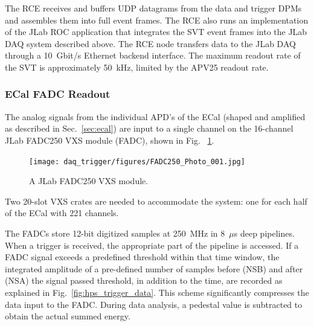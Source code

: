 The RCE receives and buffers UDP datagrams from the data and trigger DPMs and
 assembles them into full event frames. The RCE also runs an implementation of the JLab ROC application 
that integrates the SVT event frames into the JLab DAQ 
 system described above. The RCE node transfers data to the JLab DAQ  
 through a 10~Gbit/s Ethernet backend interface. The maximum readout rate of the SVT is approximately 50~kHz, limited by the APV25 readout rate. 










\subsubsection{ECal FADC Readout}
\label{sec:fadc_daq}
The analog signals from the individual APD's of the ECal (shaped and amplified as described in Sec.~\ref{sec:ecal}) are input to a single channel on the 16-channel JLab FADC250 VXS module (FADC), shown in Fig. ~\ref{fig:fadc}. 
\begin{figure}[t]
\texttt{[image: daq\_trigger/figures/FADC250\_Photo\_001.jpg]}
\caption{\small{A JLab FADC250 VXS module.}}
\label{fig:fadc}
\end{figure}

Two 20-slot VXS crates are needed to accommodate the system: one for each half of the ECal with 221 channels. 

The FADCs store 12-bit digitized samples at 250~MHz in 8~$\mu$s deep pipelines. 
When a trigger is received, the appropriate part of the pipeline is accessed. If a FADC   
signal exceeds a predefined threshold within that time window, the integrated amplitude of a pre-defined  number of samples before (NSB) and after (NSA) the signal passed threshold, in addition to the time, are recorded as explained in Fig.~\ref{fig:hps_trigger_data}. This scheme significantly compresses the data input to the FADC. During data analysis, a pedestal value is subtracted to obtain the actual summed energy.


